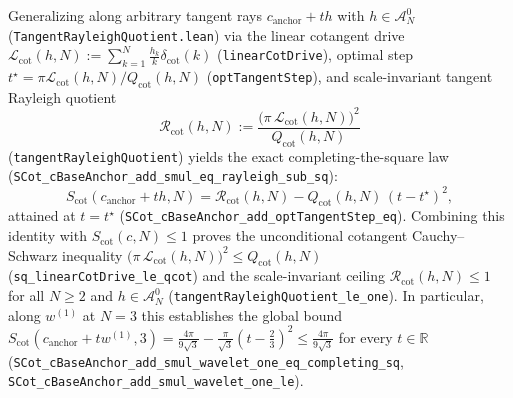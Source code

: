 \documentclass[11pt,a4paper]{article}
\theoremstyle{definition}
\begin{document}
Generalizing along arbitrary tangent rays $c_{\mathrm{anchor}} + t h$ with $h \in \mathcal{A}_N^0$ (\texttt{Tangent\allowbreak Rayleigh\allowbreak Quotient.lean}) via the linear cotangent drive $\mathcal{L}_{\mathrm{cot}}(h, N) := \sum_{k=1}^N \frac{h_k}{k}\delta_{\mathrm{cot}}(k)$ (\texttt{linearCotDrive}), optimal step $t^\star = \pi \mathcal{L}_{\mathrm{cot}}(h, N) / Q_{\mathrm{cot}}(h, N)$ (\texttt{optTangentStep}), and scale-invariant tangent Rayleigh quotient
\begin{equation}
\mathcal{R}_{\mathrm{cot}}(h, N) := \frac{\big(\pi\,\mathcal{L}_{\mathrm{cot}}(h, N)\big)^2}{Q_{\mathrm{cot}}(h, N)}
\end{equation}
(\texttt{tangentRayleighQuotient}) yields the exact completing-the-square law (\texttt{SCot\_\allowbreak cBaseAnchor\_\allowbreak add\_\allowbreak smul\_\allowbreak eq\_\allowbreak rayleigh\_\allowbreak sub\_\allowbreak sq}):
\begin{equation}
S_{\mathrm{cot}}(c_{\mathrm{anchor}} + t h, N) = \mathcal{R}_{\mathrm{cot}}(h, N) - Q_{\mathrm{cot}}(h, N)\,(t - t^\star)^2,
\end{equation}
attained at $t = t^\star$ (\texttt{SCot\_\allowbreak cBaseAnchor\_\allowbreak add\_\allowbreak optTangentStep\_\allowbreak eq}). Combining this identity with $S_{\mathrm{cot}}(c, N) \le 1$ proves the unconditional cotangent Cauchy--Schwarz inequality $\big(\pi\,\mathcal{L}_{\mathrm{cot}}(h, N)\big)^2 \le Q_{\mathrm{cot}}(h, N)$ (\texttt{sq\_\allowbreak linearCotDrive\_\allowbreak le\_\allowbreak qcot}) and the scale-invariant ceiling $\mathcal{R}_{\mathrm{cot}}(h, N) \le 1$ for all $N \ge 2$ and $h \in \mathcal{A}_N^0$ (\texttt{tangentRayleighQuotient\_\allowbreak le\_\allowbreak one}). \noindent In particular, along $w^{(1)}$ at $N = 3$ this establishes the global bound $S_{\mathrm{cot}}(c_{\mathrm{anchor}} + t w^{(1)}, 3) = \frac{4\pi}{9\sqrt{3}} - \frac{\pi}{\sqrt{3}}(t - \tfrac{2}{3})^2 \le \frac{4\pi}{9\sqrt{3}}$ for every $t \in \mathbb{R}$ (\texttt{SCot\_\allowbreak cBaseAnchor\_\allowbreak add\_\allowbreak smul\_\allowbreak wavelet\_\allowbreak one\_\allowbreak eq\_\allowbreak completing\_\allowbreak sq}, \texttt{SCot\_\allowbreak cBaseAnchor\_\allowbreak add\_\allowbreak smul\_\allowbreak wavelet\_\allowbreak one\_\allowbreak le}).
\end{document}
